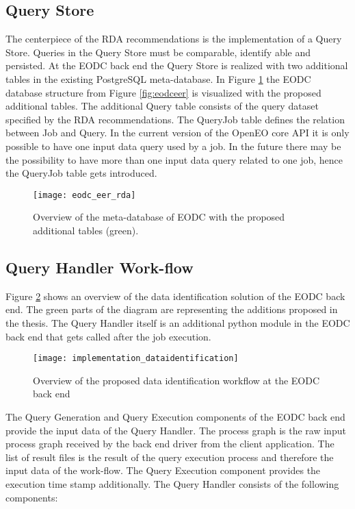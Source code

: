 \documentclass[draft,final]{vutinfth} %
\begin{document}
\subsection{Query Store}
The centerpiece of the RDA recommendations is the implementation of a Query Store. Queries in the Query Store must be comparable, identify able and persisted. At the EODC back end the Query Store is realized with two additional tables in the existing PostgreSQL meta-database. In Figure \ref{fig:eer_rda} the EODC database structure from Figure \ref{fig:eodceer} is visualized with the proposed additional tables. The additional Query table consists of the query dataset specified by the RDA recommendations. The QueryJob table defines the relation between Job and Query. In the current version of the OpenEO core API it is only possible to have one input data query used by a job. In the future there may be the possibility to have more than one input data query related to one job, hence the QueryJob table gets introduced. 

\begin{figure}[h]
	\centering
	\texttt{[image: eodc\_eer\_rda]}
	\caption{Overview of the meta-database of EODC with the proposed additional tables (green).}
	\label{fig:eer_rda} %
\end{figure}

\subsection{Query Handler Work-flow}
Figure \ref{fig:impldataid} shows an overview of the data identification solution of the EODC back end. The green parts of the diagram are representing the additions proposed in the thesis. The Query Handler itself is an additional python module in the EODC back end that gets called after the job execution. 

\begin{figure}[h]
	\centering
	\texttt{[image: implementation\_dataidentification]}
	\caption{Overview of the proposed data identification workflow at the EODC back end}
	\label{fig:impldataid} %
\end{figure}


The Query Generation and Query Execution components of the EODC back end provide the input data of the Query Handler. The process graph is the raw input process graph received by the back end driver from the client application. The list of result files is the result of the query execution process and therefore the input data of the work-flow. The Query Execution component provides the execution time stamp additionally. The Query Handler consists of the following components:
\end{document}
